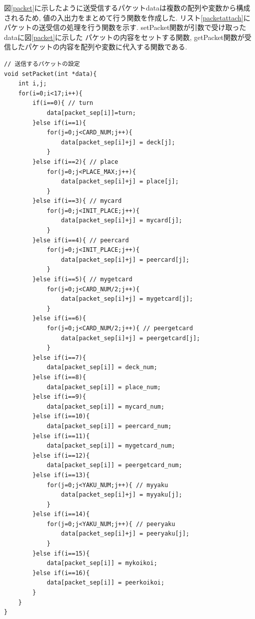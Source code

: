 \documentclass[a4j]{jarticle}
\begin{document}
    図\ref{packet}に示したように送受信するパケットdataは複数の配列や変数から構成されるため, 値の入出力をまとめて行う関数を作成した.
    リスト\ref{packetattach}にパケットの送受信の処理を行う関数を示す. setPacket関数が引数で受け取ったdataに図\ref{packet}に示した
    パケットの内容をセットする関数, getPacket関数が受信したパケットの内容を配列や変数に代入する関数である.
    \begin{lstlisting}[basicstyle=\ttfamily\footnotesize, frame=single,label=packetattach,caption=パケットの処理]
// 送信するパケットの設定
void setPacket(int *data){
    int i,j;
    for(i=0;i<17;i++){
        if(i==0){ // turn
            data[packet_sep[i]]=turn;
        }else if(i==1){
            for(j=0;j<CARD_NUM;j++){
                data[packet_sep[i]+j] = deck[j];
            }               
        }else if(i==2){ // place
            for(j=0;j<PLACE_MAX;j++){
                data[packet_sep[i]+j] = place[j];
            }           
        }else if(i==3){ // mycard 
            for(j=0;j<INIT_PLACE;j++){
                data[packet_sep[i]+j] = mycard[j];
            }
        }else if(i==4){ // peercard
            for(j=0;j<INIT_PLACE;j++){
                data[packet_sep[i]+j] = peercard[j];
            }                
        }else if(i==5){ // mygetcard
            for(j=0;j<CARD_NUM/2;j++){
                data[packet_sep[i]+j] = mygetcard[j];
            }    
        }else if(i==6){
            for(j=0;j<CARD_NUM/2;j++){ // peergetcard
                data[packet_sep[i]+j] = peergetcard[j];
            }            
        }else if(i==7){
            data[packet_sep[i]] = deck_num;
        }else if(i==8){
            data[packet_sep[i]] = place_num;
        }else if(i==9){
            data[packet_sep[i]] = mycard_num;
        }else if(i==10){
            data[packet_sep[i]] = peercard_num;
        }else if(i==11){
            data[packet_sep[i]] = mygetcard_num;
        }else if(i==12){
            data[packet_sep[i]] = peergetcard_num;
        }else if(i==13){
            for(j=0;j<YAKU_NUM;j++){ // myyaku
                data[packet_sep[i]+j] = myyaku[j];
            }              
        }else if(i==14){
            for(j=0;j<YAKU_NUM;j++){ // peeryaku
                data[packet_sep[i]+j] = peeryaku[j];
            }                
        }else if(i==15){
            data[packet_sep[i]] = mykoikoi;
        }else if(i==16){
            data[packet_sep[i]] = peerkoikoi;
        }
    }
}


\end{lstlisting}
\end{document}

